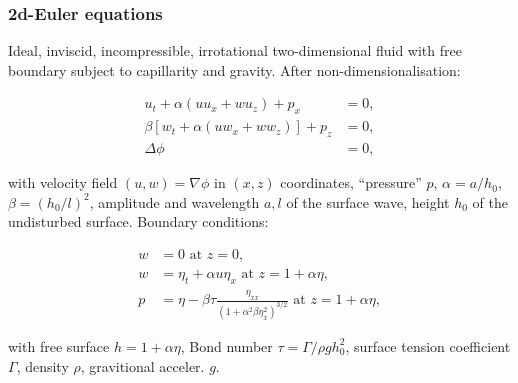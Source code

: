 \documentclass[9pt, english]{beamer}
\theoremstyle{definition}
\begin{document}
\begin{frame}
  \frametitle{2d-Euler equations}
  Ideal, inviscid, incompressible, irrotational two-dimensional fluid with free boundary subject to capillarity and
gravity. After non-dimensionalisation:
\begin{block}{}
\begin{equation*}\begin{aligned}
  u_t + \alpha(uu_x + wu_z) + p_x &= 0,\\
 \beta [w_t + \alpha(uw_x + ww_z)] + p_z &=0,\\
 \Delta \phi &= 0,
\end{aligned}\end{equation*}
\end{block}
with velocity field $(u,w)=\nabla\phi$ in $(x,z)$ coordinates,
``pressure'' $p$, $\alpha=a/h_0$, $\beta=(h_0/l)^2$, amplitude and
wavelength $a,l$ of the surface wave, height $h_0$ of the
undisturbed surface. Boundary conditions:
\begin{block}{}
\begin{equation*}\begin{aligned}
  w&=0 \mbox{ at } z=0,\\
  w&=\eta_t+\alpha u\eta_x\mbox{ at } z=1+\alpha\eta,\\
  p&=\eta - \beta\tau\frac{\eta_{xx}}{(1+\alpha^2\beta\eta_x^2)^{3/2}}\mbox{ at } z=1+\alpha\eta,
\end{aligned}\end{equation*}
\end{block}
with free surface $h=1 + \alpha\eta$, Bond number $\tau=\Gamma/\rho
g h_0^2$, surface tension coefficient $\Gamma$, density $\rho$,
gravitional acceler. $g$.
\end{frame}
\end{document}
